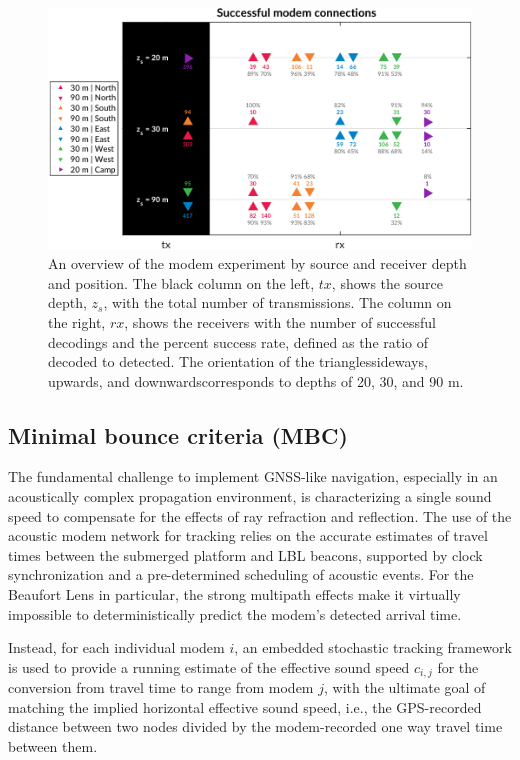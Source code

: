 \begin{figure}[h!]
  \centering
  \includegraphics[width=\textwidth]{figs/modem-chart.pdf}
  \caption{An overview of the modem experiment by source and receiver depth and position. The black column on the left, $tx$, shows the source depth, $z_s$, with the total number of transmissions. The column on the right, $rx$, shows the receivers with the number of successful decodings and the percent success rate, defined as the ratio of decoded to detected. The orientation of the triangles\textemdash sideways, upwards, and downwards\textemdash corresponds to depths of 20, 30, and 90 m.}
  \label{fig:overview}
  \end{figure}

\subsection{Minimal bounce criteria (MBC)}

The fundamental challenge to implement GNSS-like navigation, especially in an acoustically complex propagation environment, is characterizing a single sound speed to compensate for the effects of ray refraction and reflection.
The use of the acoustic modem network for tracking relies on the accurate estimates of travel times between the submerged platform and LBL beacons, supported by clock synchronization and a pre-determined scheduling of acoustic events.
 For the Beaufort Lens in particular, the strong multipath effects make it virtually impossible to deterministically predict the modem's detected arrival time.

Instead, for each individual modem $i$, an embedded stochastic tracking framework is used to provide a running estimate of the effective sound speed $c_{i,j}$ for the conversion from travel time to range from modem $j$, with the ultimate goal of matching the implied horizontal effective sound speed, i.e., the GPS-recorded distance between two nodes divided by the modem-recorded one way travel time between them. 

